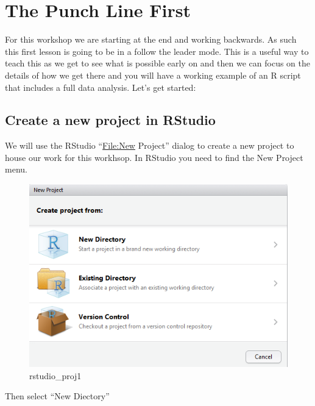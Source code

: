 \documentclass[]{article}
\title{}
\author{}
\date{}
\begin{document}
\hypertarget{the-punch-line-first}{%
\section{The Punch Line First}\label{the-punch-line-first}}

For this workshop we are starting at the end and working backwards. As
such this first lesson is going to be in a follow the leader mode. This
is a useful way to teach this as we get to see what is possible early on
and then we can focus on the details of how we get there and you will
have a working example of an R script that includes a full data
analysis. Let's get started:

\hypertarget{create-a-new-project-in-rstudio}{%
\subsection{Create a new project in
RStudio}\label{create-a-new-project-in-rstudio}}

We will use the RStudio ``\url{File:New} Project'' dialog to create a
new project to house our work for this workhsop. In RStudio you need to
find the New Project menu.

\begin{figure}
\centering
\includegraphics{figures/rstudio_proj1.png}
\caption{rstudio\_proj1}
\end{figure}

Then select ``New Diectory''
\end{document}
